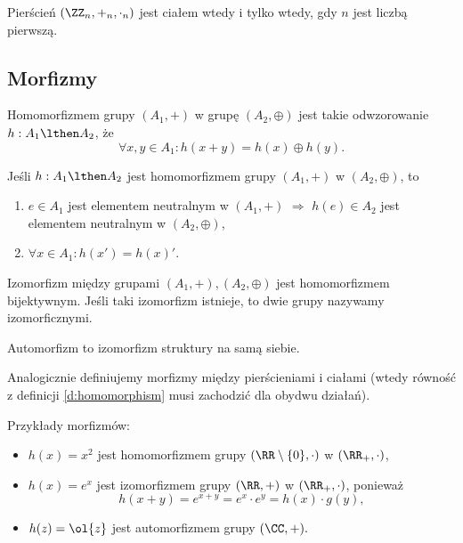 \begin{corollary}
    Pierścień $(\ZZ_n, +_n, \cdot_n)$ jest ciałem wtedy i tylko wtedy, gdy $n$ jest liczbą pierwszą.
\end{corollary}

\subsection{Morfizmy}
\begin{definition}
    \label{d:homomorphism}
    Homomorfizmem grupy $(A_1, +)$ w grupę $(A_2, \oplus)$ jest takie odwzorowanie $h : A_1 \lthen A_2$, że
    $$ \forall x, y \in A_1 : h(x + y) = h(x) \oplus h(y). $$
\end{definition}

\begin{fact}
    Jeśli $h : A_1 \lthen A_2$ jest homomorfizmem grupy $(A_1, +)$ w $(A_2, \oplus)$, to
    \begin{enumerate}
        \item $e \in A_1$ jest elementem neutralnym w $(A_1, +)$ $\Longrightarrow$ $h(e) \in A_2$ jest elementem neutralnym w $(A_2, \oplus)$,
        \item $\forall x \in A_1 : h(x') = h(x)'$.
    \end{enumerate}
\end{fact}

\begin{definition}
    Izomorfizm między grupami $(A_1, +), (A_2, \oplus)$ jest homomorfizmem bijektywnym. Jeśli taki izomorfizm istnieje, to dwie grupy nazywamy izomorficznymi.
\end{definition}

\begin{definition}
    Automorfizm to izomorfizm struktury na samą siebie.
\end{definition}

Analogicznie definiujemy morfizmy między pierścieniami i ciałami (wtedy równość z definicji \ref{d:homomorphism} musi zachodzić dla obydwu działań).

\begin{example}
    Przykłady morfizmów:
    \begin{itemize}
        \item $h(x) = x^2$ jest homomorfizmem grupy $(\RR \setminus \{0\}, \cdot)$ w $(\RR_+, \cdot)$,
        \item $h(x) = e^x$ jest izomorfizmem grupy $(\RR, +)$ w $(\RR_+, \cdot)$, ponieważ
        $$ h(x + y) = e^{x + y} = e^x \cdot e^y = h(x) \cdot g(y), $$
        \item $h(z) = \ol{z}$ jest automorfizmem grupy $(\CC, +).$
    \end{itemize}
\end{example}

